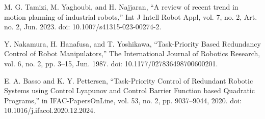 \documentclass[letterpaper, 10 pt, conference]{ieeeconf}  %
\begin{document}
\begin{thebibliography}{99}
	
 M. G. Tamizi, M. Yaghoubi, and H. Najjaran, “A review of recent trend in motion planning of industrial robots,” Int J Intell Robot Appl, vol. 7, no. 2, Art. no. 2, Jun. 2023. doi: 10.1007/s41315-023-00274-2.
	






 Y. Nakamura, H. Hanafusa, and T. Yoshikawa, “Task-Priority Based Redundancy Control of Robot Manipulators,” The International Journal of Robotics Research, vol. 6, no. 2, pp. 3–15, Jun. 1987. doi: 10.1177/027836498700600201.

 E. A. Basso and K. Y. Pettersen, “Task-Priority Control of Redundant Robotic Systems using Control Lyapunov and Control Barrier Function based Quadratic Programs,” in IFAC-PapersOnLine, vol. 53, no. 2, pp. 9037–9044, 2020. doi: 10.1016/j.ifacol.2020.12.2024.


\end{thebibliography}
\end{document}
